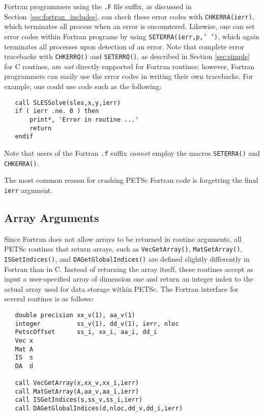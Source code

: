 {Fortran programmers using the {\tt .F} file suffix, as discussed in
Section~\ref{sec:fortran_includes}, can check these error codes with
{\tt CHKERRA(ierr)}, which terminates all process when an error is
encountered.  Likewise, one can set error codes within Fortran programs by
using {\tt SETERRA(ierr,p,' ')}, which again terminates all processes
upon detection of an error.  
Note that complete error tracebacks with
{\tt CHKERRQ()} and {\tt SETERRQ()}, as described in Section
\ref{sec:simple} for C routines, are {\em not} directly supported for
Fortran routines; however, Fortran programmers can easily use the
error codes in writing their own tracebacks.  For example, one could
use code such as the following:
\begin{verbatim}
   call SLESSolve(sles,x,y,ierr)
   if ( ierr .ne. 0 ) then
       print*, 'Error in routine ...'
       return
   endif
\end{verbatim}
Note that users of the Fortran {\tt .f} suffix {\em cannot} employ the
macros {\tt SETERRA()} and {\tt CHKERRA()}.

The most common reason for crashing PETSc Fortran code is forgetting the 
final {\tt ierr} argument.

\subsection{Array Arguments}
\label{sec:fortranarrays}

Since Fortran does not allow arrays to be returned in routine
arguments, all PETSc routines that return arrays, such as 
{\tt VecGetArray()}, {\tt MatGetArray()}, 
{\tt ISGetIndices()}, and {\tt DAGetGlobalIndices()}
are defined slightly differently in Fortran than in C.  
  
 
Instead of returning the array itself, these routines
accept as input a user-specified array of dimension one and return an
integer index to the actual array used for data storage within PETSc.
The Fortran interface for several routines is as follows:
\begin{verbatim}
   double precision xx_v(1), aa_v(1)
   integer          ss_v(1), dd_v(1), ierr, nloc
   PetscOffset      ss_i, xx_i, aa_i, dd_i
   Vec x
   Mat A
   IS  s
   DA  d

   call VecGetArray(x,xx_v,xx_i,ierr)
   call MatGetArray(A,aa_v,aa_i,ierr)
   call ISGetIndices(s,ss_v,ss_i,ierr)
   call DAGetGlobalIndices(d,nloc,dd_v,dd_i,ierr)
\end{verbatim}

}

